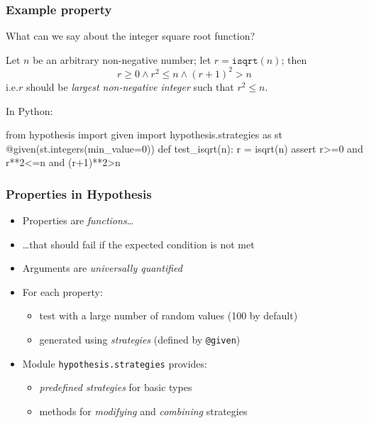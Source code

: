 \documentclass{beamer}
\begin{document}
\begin{frame}[fragile]
  \frametitle{Example property}

  What can we say about the integer square root function?
  \pause
  \medskip

  Let $n$ be an arbitrary non-negative number;
  let $r = \texttt{isqrt}(n)$; then
  \[ r\geq0 \land r^2 \leq n \land (r+1)^2>n  \]
  i.e.\@ $r$ should be \emph{largest non-negative integer} such that
  $r^2 \leq n$.
  \pause
  \medskip

  In Python:
\begin{semiverbatim}
from hypothesis import given
import hypothesis.strategies as st
@given(\alert<5>{st.integers(min_value=0)})  
def test_isqrt(\alert<4>{n}):                
    r = isqrt(n)
    assert \alert<6>{r>=0 and r**2<=n and (r+1)**2>n}   
  \end{semiverbatim}

  
\end{frame}

\begin{frame}
  \frametitle{Properties in Hypothesis}

  \begin{itemize}
  \item Properties are \emph{functions}\ldots
  \item \ldots that should fail if the expected condition is not met
  \item Arguments are \emph{universally quantified}
  \item For each property:
    \begin{itemize}
  \item test with a large number of random values (100 by default)
  \item generated using \emph{strategies}
  (defined by \texttt{@given})
    \end{itemize}
  \item Module \texttt{hypothesis.strategies} provides:
    \begin{itemize}
    \item \emph{predefined strategies} for basic types
    \item methods for \emph{modifying} and \emph{combining} strategies
    \end{itemize}
  \end{itemize}
\end{frame}
\end{document}
